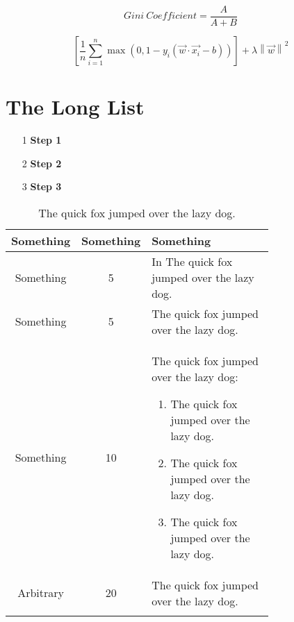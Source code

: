 \documentclass[12pt,phd ,a4paper,oneside]{ucl_thesis}
\begin{document}
\begin{equation}
Gini\ Coefficient = \frac{A}{A+B}
\end{equation}

\begin{equation}
\left [ \frac{1}{n}\sum_{i=1}^{n}\max \left ( 0,1-y_{i}\left ( \vec{w}\cdot\vec{x_{i}}-b \right ) \right ) \right ]+\lambda\left \| \vec{w} \right \|^{2}
\end{equation}
\lipsum

\chapter{The Long List}\label{chapter3}
	\lipsum

\begin{enumerate}
	\item[1] \textbf{Step 1}
\end{enumerate}
	\lipsum
\begin{enumerate}
	\item[2] \textbf{Step 2}
\end{enumerate}
	\lipsum
\begin{enumerate}	
	\item[3] \textbf{Step 3}
\end{enumerate}
	
	\lipsum
\clearpage	
\begin{longtable}{|c|c|m{0.75\linewidth}|}%
		\hline 
		\textbf{Something} & 	\textbf{Something} & 	\textbf{Something}\\ \hline 
		
		Something & 5 & In \cite{Cinelli2017} The quick fox jumped over the lazy dog. \\\hline 
		
		 Something & 5 & The quick fox jumped over the lazy dog.\\\hline 
		
	 	Something& 10 & The quick fox jumped over the lazy dog: 
		\begin{enumerate}
			\item The quick fox jumped over the lazy dog.
			\item The quick fox jumped over the lazy dog.
			\item The quick fox jumped over the lazy dog.
		\end{enumerate}
		\\\hline 
		
	Arbitrary &20 & The quick fox jumped over the lazy dog. \\\hline 
	\caption[Something]{The quick fox jumped over the lazy dog.}\label{table8}
\end{longtable}
\end{document}
